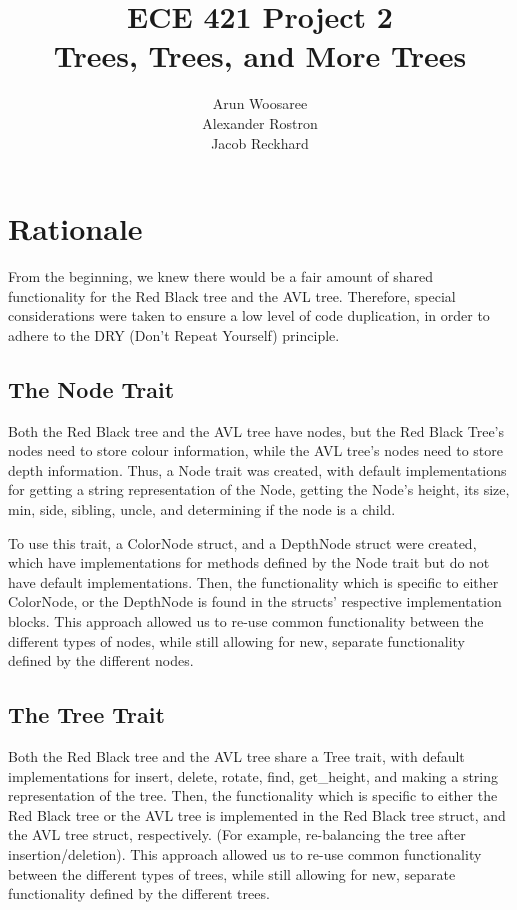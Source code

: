 \documentclass[letterpaper]{article}
\title{ECE 421 Project 2\\
Trees, Trees, and More Trees}
\author{Arun Woosaree\\
Alexander Rostron\\
Jacob Reckhard
}
\begin{document}
\maketitle %

\section{Rationale}
From the beginning, we knew there would be a fair amount of shared functionality
for the Red Black tree and the AVL tree. Therefore, special considerations were
taken to ensure a low level of code duplication, in order to adhere to the DRY
(Don't Repeat Yourself) principle.

\subsection{The Node Trait}\label{dry}
Both the Red Black tree and the AVL tree have nodes, but the Red Black Tree's
nodes need to store colour information, while the AVL tree's nodes need to store
depth information. Thus, a Node trait was created, with default implementations
for getting a string representation of the Node, getting the Node's height, its
size, min, side, sibling, uncle, and determining if the node is a child.

To use this trait, a ColorNode struct, and a DepthNode struct were created,
which have implementations for methods defined by the Node trait but do not have
default implementations. Then, the functionality which is specific to either
ColorNode, or the DepthNode is found in the structs' respective implementation
blocks. This approach allowed us to re-use common functionality between the
different types of nodes, while still allowing for new, separate functionality
defined by the different nodes. 

\subsection{The Tree Trait}

Both the Red Black tree and the AVL tree share a Tree trait, with default
implementations for insert, delete, rotate, find, get\_height, and making a
string representation of the tree. Then, the functionality which is specific to
either the Red Black tree or the AVL tree is implemented in the Red Black tree
struct, and the AVL tree struct, respectively.  (For example, re-balancing the
tree after insertion/deletion).  This approach allowed us to re-use common
functionality between the different types of trees, while still allowing for
new, separate functionality defined by the different trees.
\end{document}
